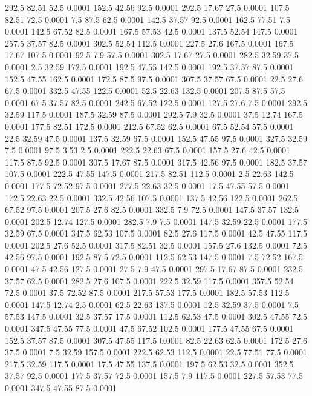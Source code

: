 292.5	82.51	52.5	0.0001
152.5	42.56	92.5	0.0001
292.5	17.67	27.5	0.0001
107.5	82.51	72.5	0.0001
7.5	87.5	62.5	0.0001
142.5	37.57	92.5	0.0001
162.5	77.51	7.5	0.0001
142.5	67.52	82.5	0.0001
167.5	57.53	42.5	0.0001
137.5	52.54	147.5	0.0001
257.5	37.57	82.5	0.0001
302.5	52.54	112.5	0.0001
227.5	27.6	167.5	0.0001
167.5	17.67	107.5	0.0001
92.5	7.9	57.5	0.0001
302.5	17.67	27.5	0.0001
282.5	32.59	37.5	0.0001
2.5	32.59	172.5	0.0001
192.5	47.55	142.5	0.0001
192.5	37.57	87.5	0.0001
152.5	47.55	162.5	0.0001
172.5	87.5	97.5	0.0001
307.5	37.57	67.5	0.0001
22.5	27.6	67.5	0.0001
332.5	47.55	122.5	0.0001
52.5	22.63	132.5	0.0001
207.5	87.5	57.5	0.0001
67.5	37.57	82.5	0.0001
242.5	67.52	122.5	0.0001
127.5	27.6	7.5	0.0001
292.5	32.59	117.5	0.0001
187.5	32.59	87.5	0.0001
292.5	7.9	32.5	0.0001
37.5	12.74	167.5	0.0001
177.5	82.51	172.5	0.0001
212.5	67.52	62.5	0.0001
67.5	52.54	57.5	0.0001
22.5	32.59	47.5	0.0001
137.5	32.59	67.5	0.0001
152.5	47.55	97.5	0.0001
327.5	32.59	7.5	0.0001
97.5	3.53	2.5	0.0001
222.5	22.63	67.5	0.0001
157.5	27.6	42.5	0.0001
117.5	87.5	92.5	0.0001
307.5	17.67	87.5	0.0001
317.5	42.56	97.5	0.0001
182.5	37.57	107.5	0.0001
222.5	47.55	147.5	0.0001
217.5	82.51	112.5	0.0001
2.5	22.63	142.5	0.0001
177.5	72.52	97.5	0.0001
277.5	22.63	32.5	0.0001
17.5	47.55	57.5	0.0001
172.5	22.63	22.5	0.0001
332.5	42.56	107.5	0.0001
137.5	42.56	122.5	0.0001
262.5	67.52	97.5	0.0001
207.5	27.6	82.5	0.0001
332.5	7.9	72.5	0.0001
147.5	37.57	132.5	0.0001
202.5	12.74	127.5	0.0001
282.5	7.9	7.5	0.0001
147.5	32.59	22.5	0.0001
177.5	32.59	67.5	0.0001
347.5	62.53	107.5	0.0001
82.5	27.6	117.5	0.0001
42.5	47.55	117.5	0.0001
202.5	27.6	52.5	0.0001
317.5	82.51	32.5	0.0001
157.5	27.6	132.5	0.0001
72.5	42.56	97.5	0.0001
192.5	87.5	72.5	0.0001
112.5	62.53	147.5	0.0001
7.5	72.52	167.5	0.0001
47.5	42.56	127.5	0.0001
27.5	7.9	47.5	0.0001
297.5	17.67	87.5	0.0001
232.5	37.57	62.5	0.0001
282.5	27.6	107.5	0.0001
222.5	32.59	117.5	0.0001
357.5	52.54	72.5	0.0001
37.5	72.52	87.5	0.0001
217.5	57.53	177.5	0.0001
182.5	57.53	112.5	0.0001
147.5	12.74	2.5	0.0001
62.5	22.63	137.5	0.0001
12.5	32.59	37.5	0.0001
7.5	57.53	147.5	0.0001
32.5	37.57	17.5	0.0001
112.5	62.53	47.5	0.0001
302.5	47.55	72.5	0.0001
347.5	47.55	77.5	0.0001
47.5	67.52	102.5	0.0001
177.5	47.55	67.5	0.0001
152.5	37.57	87.5	0.0001
307.5	47.55	117.5	0.0001
82.5	22.63	62.5	0.0001
172.5	27.6	37.5	0.0001
7.5	32.59	157.5	0.0001
222.5	62.53	112.5	0.0001
22.5	77.51	77.5	0.0001
217.5	32.59	117.5	0.0001
17.5	47.55	137.5	0.0001
197.5	62.53	32.5	0.0001
352.5	37.57	92.5	0.0001
177.5	37.57	72.5	0.0001
157.5	7.9	117.5	0.0001
227.5	57.53	77.5	0.0001
347.5	47.55	87.5	0.0001
